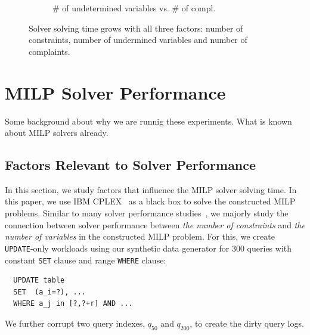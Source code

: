 \begin{figure}[t]
\begin{subfigure} [t]{.3\textwidth}
    \vspace*{-.25in}
    \caption{\# of undetermined variables vs. \# of compl.}
    \vspace*{-.1in}
    \label{f:compl_vs_time}
    \end{subfigure}
    \fi
   \caption{Solver solving time grows with all three factors: number of constraints, number of undermined variables and number of complaints. }
   \vspace*{-.1in}
   \label{f:soltime}
  \end{figure}
\fi

\iffalse


\section{MILP Solver Performance}
\label{app:solvtime}

Some background about why we are runnig these experiments.  What is known about MILP solvers already.

\subsection{Factors Relevant to Solver Performance}

In this section, we study factors that influence the MILP solver solving time. In this paper, we
use IBM CPLEX~\cite{cplex2014v12} as a black box to solve the constructed MILP problems.   Similar to many solver performance studies~\cite{atamturk2005integer, meindl2012analysis, gearhart2013comparison}, 
we majorly study the connection between solver performance between \textit{the number of constraints} and \textit{the number of variables} in the constructed MILP problem. For this, we create \texttt{UPDATE}-only workloads using our synthetic data generator for 300 queries with constant \texttt{SET} clause and range \texttt{WHERE} clause: 

{\scriptsize
\begin{verbatim}
  UPDATE table
  SET  (a_i=?), ...
  WHERE a_j in [?,?+r] AND ...
\end{verbatim}
}
We further corrupt two query indexes, $q_{50}$ and $q_{200}$, to create the dirty query logs.    


